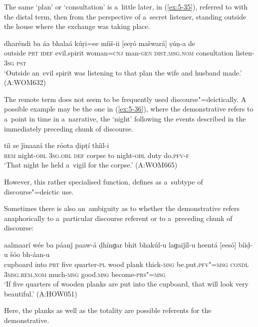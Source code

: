 The same `plan' or `consultation' is a~little later, in (\ref{ex:5-35}), referred to with the distal term, then from the perspective of a~secret listener, standing outside the house where the exchange was taking place.
\begin{exe}
\ex
\label{ex:5-35}
\gll dharéndi ba áa bhalaá kúṛi=ee míiš-ii [eeṛó mašwará] ṣúṇ-a de \\
outside \textsc{prt} \textsc{idef} evil.spirit woman=\textsc{cnj} man-\textsc{gen} \textsc{dist.msg.nom} consultation listen-\textsc{3sg} \textsc{pst} \\
\glt `Outside an~evil spirit was listening to that plan the wife and husband made.' (A:WOM632)
\end{exe}
The remote term does not seem to be frequently used discourse"=deictically. A possible example may be the one in (\ref{ex:5-36}), where the demonstrative refers to a~point in time in a~narrative, the `night' following the events described in the immediately preceding chunk of discourse.
\begin{exe}
\ex
\label{ex:5-36}
 tíi se ǰinaazá the róota ḍipṭí thíil-i\\
\textsc{rem} night-\textsc{obl} \textsc{3sg.obl} \textsc{def} corpse to night-\textsc{obl} duty do.\textsc{pfv-f}\\
\glt `That night he held a~vigil for the corpse.' (A:WOM665)
\end{exe}
However, this rather specialised function, \citet[225]{himmelmann1996} defines as a~subtype of discourse"=deictic use.

Sometimes there is also an~ambiguity as to whether the demonstrative refers anaphorically to a~particular discourse referent or to a~preceding chunk of discourse:

\begin{exe}
\ex
\label{ex:5-37}
\gll aalmaarí wée ba páanǰ paaw-á ḍhínɡar bhit bhakúl-u laɡaiǰíl-u heentá [eesó] bíiḍ-u šóo bh-áan-u \\
cupboard into \textsc{prt} five quarter-\textsc{pl} wood plank thick-\textsc{msg} be.put.\textsc{pfv"=msg} \textsc{condl} \textsc{3msg.rem.nom} much-\textsc{msg} good.\textsc{msg} become-\textsc{prs"=msg}\\
\glt `If five quarters of wooden planks are put into the cupboard, that will look very beautiful.'
(A:HOW051)
\end{exe}

Here, the planks as well as the totality are possible referents for the demonstrative.

